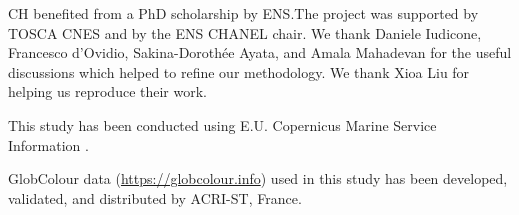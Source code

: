 

\begin{acknowledgements}
CH benefited from a PhD scholarship by ENS.\@ The project was supported by TOSCA CNES and by the ENS CHANEL chair.
We thank Daniele Iudicone, Francesco d'Ovidio, Sakina-Dorothée Ayata, and Amala Mahadevan for the useful discussions which helped to refine our methodology. We thank Xioa Liu for helping us reproduce their work.

This study has been conducted using E.U. Copernicus Marine Service Information \parencite[datasets used:][]{chl, sst}.

GlobColour data (\url{https://globcolour.info}) used in this study has been developed, validated, and distributed by ACRI-ST, France.
\end{acknowledgements}

% 

